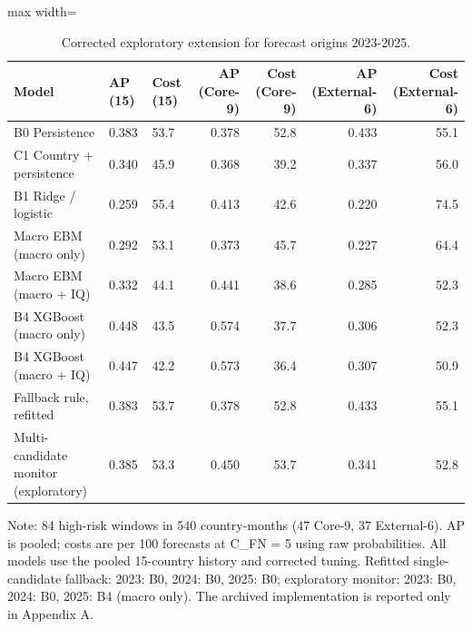 \documentclass[preprint,12pt,authoryear]{elsarticle}
\begin{document}
\begin{table}[!htbp]
\centering
\scriptsize
\setlength{\tabcolsep}{3pt}
\caption{Corrected exploratory extension for forecast origins 2023-2025.}
\label{tab:ext}
\begin{adjustbox}{max width=\textwidth}
\begin{tabular}{lllrrrr}
\toprule
Model & AP (15) & Cost (15) & AP (Core-9) & Cost (Core-9) & AP (External-6) & Cost (External-6) \\
\midrule
B0 Persistence & 0.383 & 53.7 & 0.378 & 52.8 & 0.433 & 55.1 \\
C1 Country + persistence & 0.340 & 45.9 & 0.368 & 39.2 & 0.337 & 56.0 \\
B1 Ridge / logistic & 0.259 & 55.4 & 0.413 & 42.6 & 0.220 & 74.5 \\
Macro EBM (macro only) & 0.292 & 53.1 & 0.373 & 45.7 & 0.227 & 64.4 \\
Macro EBM (macro + IQ) & 0.332 & 44.1 & 0.441 & 38.6 & 0.285 & 52.3 \\
B4 XGBoost (macro only) & 0.448 & 43.5 & 0.574 & 37.7 & 0.306 & 52.3 \\
B4 XGBoost (macro + IQ) & 0.447 & 42.2 & 0.573 & 36.4 & 0.307 & 50.9 \\
Fallback rule, refitted & 0.383 & 53.7 & 0.378 & 52.8 & 0.433 & 55.1 \\
Multi-candidate monitor (exploratory) & 0.385 & 53.3 & 0.450 & 53.7 & 0.341 & 52.8 \\
\bottomrule
\end{tabular}
\end{adjustbox}
\par\vspace{2pt}\parbox{0.95\linewidth}{\scriptsize Note: 84 high-risk windows in 540 country-months (47 Core-9, 37 External-6). AP is pooled; costs are per 100 forecasts at C\_FN = 5 using raw probabilities. All models use the pooled 15-country history and corrected tuning. Refitted single-candidate fallback: 2023: B0, 2024: B0, 2025: B0; exploratory monitor: 2023: B0, 2024: B0, 2025: B4 (macro only). The archived implementation is reported only in Appendix A.}
\end{table}
\end{document}
